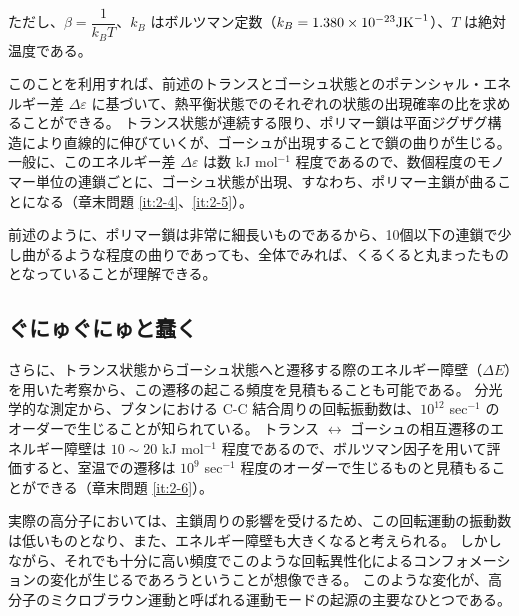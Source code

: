 \documentclass[a4paper,11pt]{jlreq}
\begin{document}
ただし、$\beta=\dfrac{1}{k_B T}$、$k_B$ はボルツマン定数（$k_B =1.380 \times 10^{-23} {\rm J K}^{-1}$）、$T$ は絶対温度である。

このことを利用すれば、前述のトランスとゴーシュ状態とのポテンシャル・エネルギー差 $\Delta \varepsilon$ に基づいて、熱平衡状態でのそれぞれの状態の出現確率の比を求めることができる。
トランス状態が連続する限り、ポリマー鎖は平面ジグザグ構造により直線的に伸びていくが、ゴーシュが出現することで鎖の曲りが生じる。
一般に、このエネルギー差 $\Delta \varepsilon$ は数 kJ mol$^{-1}$ 程度であるので、数個程度のモノマー単位の連鎖ごとに、ゴーシュ状態が出現、すなわち、ポリマー主鎖が曲ることになる（章末問題 \ref{it:2-4}、\ref{it:2-5}）。

前述のように、ポリマー鎖は非常に細長いものであるから、10個以下の連鎖で少し曲がるような程度の曲りであっても、全体でみれば、くるくると丸まったものとなっていることが理解できる。

\subsection{ぐにゅぐにゅと蠢く}

さらに、トランス状態からゴーシュ状態へと遷移する際のエネルギー障壁（$\Delta E$）を用いた考察から、この遷移の起こる頻度を見積もることも可能である。
分光学的な測定から、ブタンにおける C-C 結合周りの回転振動数は、$10^{12}$ sec$^{-1}$ のオーダーで生じることが知られている。
トランス $\leftrightarrow$ ゴーシュの相互遷移のエネルギー障壁は $10 \sim 20$ kJ mol$^{-1}$ 程度であるので、ボルツマン因子を用いて評価すると、室温での遷移は $10^{9}$ sec$^{-1}$ 程度のオーダーで生じるものと見積もることができる（章末問題 \ref{it:2-6}）。

実際の高分子においては、主鎖周りの影響を受けるため、この回転運動の振動数は低いものとなり、また、エネルギー障壁も大きくなると考えられる。
しかしながら、それでも十分に高い頻度でこのような回転異性化によるコンフォメーションの変化が生じるであろうということが想像できる。
このような変化が、高分子のミクロブラウン運動と呼ばれる運動モードの起源の主要なひとつである。
\end{document}
